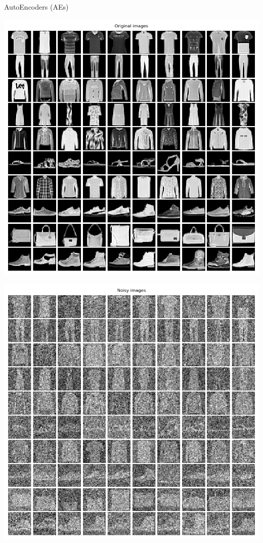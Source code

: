 \begin{frame}[allowframebreaks]{AutoEncoders (AEs)}
    \begin{center}
        \begin{minipage}{0.32\textwidth}
            \includegraphics[width=\textwidth]{../resources/ae/fashion_mnist.png}
        \end{minipage}
        \begin{minipage}{0.32\textwidth}
            \includegraphics[width=\textwidth]{../resources/ae/fashion_mnist_noisy.png}

\end{minipage}
\end{center}
\end{frame}
